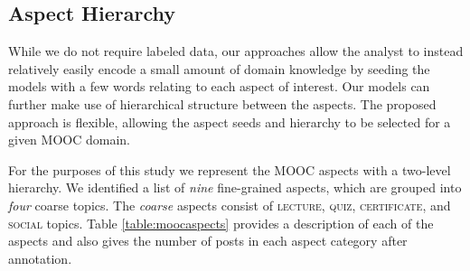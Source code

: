 
\subsection{Aspect Hierarchy}
 \label{sec:aspects}
While we do not require labeled data, our approaches allow the analyst to instead relatively easily encode a small amount of domain knowledge by seeding the models with a few words relating to each aspect of interest.
Our models can further make use of hierarchical structure between the aspects.
The proposed approach is flexible, allowing the aspect seeds and hierarchy to be selected for a given MOOC domain.

For the purposes of this study we represent the MOOC aspects with a two-level hierarchy.
We identified a list of \textit{nine} fine-grained aspects, which are grouped into \textit{four} coarse topics. %
The \textit{coarse} aspects consist of \textsc{lecture}, \textsc{quiz}, \textsc{certificate}, and \textsc{social} topics.
Table \ref{table:moocaspects} provides a description of each of the aspects and also gives the number of posts in each aspect category after annotation.

